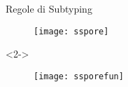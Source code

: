 \begin{frame}{Regole di Subtyping}
	\begin{figure}
		\centering\texttt{[image: sspore]}
	\end{figure}
	
	\begin{onlyenv}<2->
		\begin{figure}
			\centering\texttt{[image: ssporefun]}
		\end{figure}
	\end{onlyenv}
\end{frame}